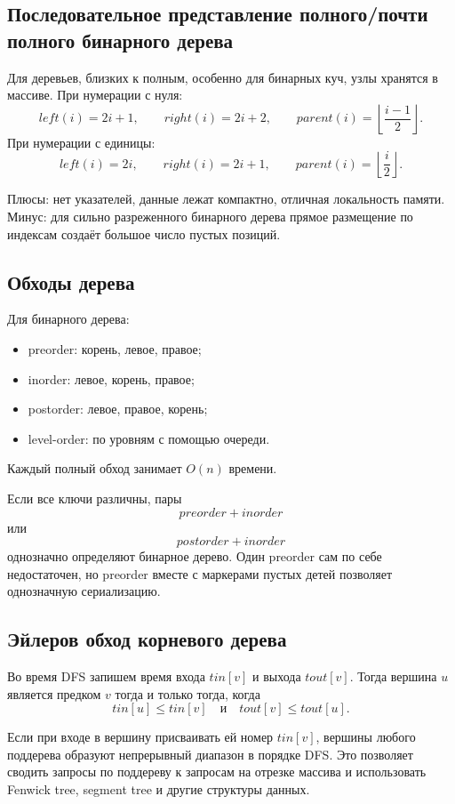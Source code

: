 \subsection{Последовательное представление полного/почти полного бинарного дерева}

Для деревьев, близких к полным, особенно для бинарных куч, узлы хранятся в
массиве. При нумерации с нуля:
\[
 left(i)=2i+1,
 \qquad
 right(i)=2i+2,
 \qquad
 parent(i)=\left\lfloor\frac{i-1}{2}\right\rfloor.
\]
При нумерации с единицы:
\[
 left(i)=2i,
 \qquad right(i)=2i+1,
 \qquad parent(i)=\left\lfloor\frac i2\right\rfloor.
\]

Плюсы: нет указателей, данные лежат компактно, отличная локальность памяти.
Минус: для сильно разреженного бинарного дерева прямое размещение по индексам
создаёт большое число пустых позиций.

\subsection{Обходы дерева}

Для бинарного дерева:
\begin{itemize}
 \item preorder: корень, левое, правое;
 \item inorder: левое, корень, правое;
 \item postorder: левое, правое, корень;
 \item level-order: по уровням с помощью очереди.
\end{itemize}
Каждый полный обход занимает $O(n)$ времени.

Если все ключи различны, пары
\[
    preorder+inorder
\]
или
\[
    postorder+inorder
\]
однозначно определяют бинарное дерево. Один preorder сам по себе недостаточен,
но preorder вместе с маркерами пустых детей позволяет однозначную сериализацию.

\subsection{Эйлеров обход корневого дерева}

Во время DFS запишем время входа $tin[v]$ и выхода $tout[v]$. Тогда вершина $u$
является предком $v$ тогда и только тогда, когда
\[
    tin[u]\le tin[v]
    \quad\text{и}\quad
    tout[v]\le tout[u].
\]

Если при входе в вершину присваивать ей номер $tin[v]$, вершины любого поддерева
образуют непрерывный диапазон в порядке DFS. Это позволяет сводить запросы по
поддереву к запросам на отрезке массива и использовать Fenwick tree, segment tree
и другие структуры данных.


